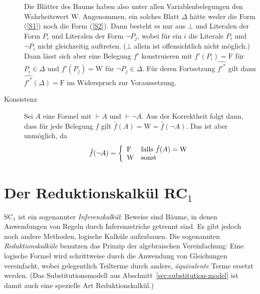 \begin{beweis}
\begin{description}
    Die Blätter des Baums haben also unter allen Variablenbelegungen den
    Wahrheitswert $\mathrm{W}$.  Angenommen, ein solches Blatt $\Delta$ hätte weder die
    Form (\ref{S1}) noch die Form (\ref{S2}).  Dann besteht es nur aus $\bot$
    und Literalen der Form $P_i$ und Literalen der Form $\neg P_j$, wobei
    für ein $i$ die Literale $P_i$ und $\neg P_i$ nicht gleichzeitig auftreten.
    ($\bot$ allein ist offensichtlich nicht möglich.)  Dann lässt sich aber eine
    Belegung $f'$ konstruieren mit $f'(P_i) = \mathrm{F}$ für
    $P_i\in \Delta$ und $f'(P_j) = \mathrm{W}$ für
    $\neg P_j\in \Delta$.  Für deren Fortsetzung $\widehat{\mbox{$f'$}^*}$ gilt dann
    $\widehat{\mbox{$f'$}^*}(\Delta)=\mathrm{F}$ im Widerspruch zur Voraussetzung.
  \item[Konsistenz] Sei $A$ eine Formel mit $\vdash A$ und $\vdash
    \neg A$.  Aus der Korrektheit folgt dann, dass für jede
    Belegung $f$ gilt ${\hat{f}}(A) = \mathrm{W} =
    {\hat{f}}(\neg A)$.  Das ist aber unmöglich, da 
    \[{\hat{f}}(\neg A)
    = \left\{\begin{array}{ll}
        \mathrm{F} & \mbox{\rm falls\ }{\hat{f}}(A)=\mathrm{W}\\
        \mathrm{W} & \mbox{\rm sonst}
      \end{array}\right.\]
    \end{description}
\end{beweis}
  

\section{Der Reduktionskalkül RC$_1$}
\label{sec:rc1}

SC$_1$ ist ein sogenannter \textit{Inferenzkalkül}: Beweise sind Bäume, in
denen Anwendungen von Regeln durch Inferenzstriche getrennt sind.  Es gibt
jedoch noch andere Methoden, logische Kalküle aufzubauen.  Die sogenannten
\textit{Reduktionskalküle} benutzen das Prinzip der algebraischen
Vereinfachung: Eine logische Formel wird schrittweise durch die Anwendung von
Gleichungen vereinfacht, wobei gelegentlich Teilterme durch andere, 
\emph{äquivalente} Terme ersetzt werden.  %
(Das Substitutionsmodell aus Abschnitt~\ref{sec:substitution-model}
ist damit auch eine spezielle Art Reduktionskalkül.)

